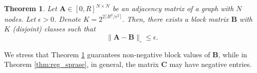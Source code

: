 \documentclass[letterpaper]{article} %
\newtheorem{theorem}{Theorem}
\begin{document}
\begin{theorem}
\label{thm:reg_sprase2}
     Let $\mathbf{A}\in[0,R]^{N\times N}$ be an adjacency matrix of a graph with $N$ nodes. Let $\epsilon>0$. Denote $K=2^{2\lceil R^2/\epsilon^2\rceil}$.         Then, there exists a block matrix  $\mathbf{B}$ with $K$ (disjoint) classes such that 
    \begin{equation}
        \label{eq:reg_sparse2}
    \|\mathbf{A}-\mathbf{B}\|_{\square} \leq \epsilon.
    \end{equation}
\end{theorem}


We stress that Theorem \ref{thm:reg_sprase2} guarantees non-negative block values of $\mathbf{B}$, while in Theorem \ref{thm:reg_sprase}, in general, the matrix $\mathbf{C}$ may have negative entries.

\end{document}
